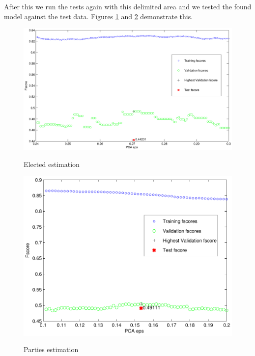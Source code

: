 \documentclass[a4paper,10pt]{article}
\begin{document}
After this we run the tests again with this delimited area and we tested the found model against the test data. Figures \ref{fig:elecTest} and \ref{fig:partiesTest} demonstrate this.

\begin{figure}
\begin{center}
	\caption{Elected estimation}
	{\includegraphics[scale=0.5,angle=0]{./img/lda_elec_test.pdf}}
	\label{fig:elecTest}
\end{center}
\end{figure}


\begin{figure}
\begin{center}
	\caption{Parties estimation}
	{\includegraphics[scale=0.5,angle=0]{./img/lda_party_test.pdf}}
	\label{fig:partiesTest}
\end{center}
\end{figure}
\end{document}
